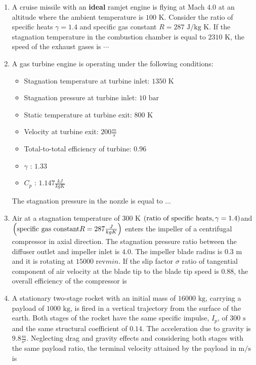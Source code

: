 \documentclass[journal,12pt,twocolumn]{IEEEtran}
\theoremstyle{remark}
\begin{document}
\begin{enumerate}[start=40]
    \item A cruise missile with an \textbf{ideal} ramjet engine is flying at Mach $4.0$ at an altitude where the ambient temperature is $100 \text{ K}$. Consider the ratio of specific heats $\gamma = 1.4$ and specific gas constant $R = 287 \text{ J/kg K}$. If the stagnation temperature in the combustion chamber is equal to $2310 \text{ K}$, the speed of the exhaust gases  is $\cdots$

    \item A gas turbine engine is operating under the following conditions:
    \begin{itemize}
        \item Stagnation temperature at turbine inlet: $1350 \text{ K}$
        \item Stagnation pressure at turbine inlet: $10 \text{ bar}$
        \item Static temperature at turbine exit: $800 \text{ K}$
        \item Velocity at turbine exit: $200  \frac{m}{s}$
        \item Total-to-total efficiency of turbine: $0.96$
        \item $\gamma$ : $1.33$
        \item $C_p$ : $1.147 \frac{ kJ}{kg K}$
    \end{itemize}
    
    The stagnation pressure  in the nozzle  is equal to $\dots$

    \item Air at a stagnation temperature of $300 \text{ K}$ $\left(\text{ratio of specific heats}, \gamma = 1.4 \right)$and $\left(\text{specific gas constant} R = 287 \frac {J}{kg K}\right)$ enters the impeller of a centrifugal compressor in axial direction. The stagnation pressure ratio between the diffuser outlet and impeller inlet is $4.0$. The impeller blade radius is $0.3 \text{ m}$ and it is rotating at $15000 \text{ rev}{min}$. If the slip factor $\sigma$ ratio of tangential component of air velocity   at the blade tip to the blade tip speed is $0.88$, the overall efficiency  of the compressor  is

    \item A stationary two-stage rocket with an initial mass of $16000 \text{ kg}$, carrying a payload of $1000 \text{ kg}$, is fired in a vertical trajectory from the surface of the earth. Both stages of the rocket have the same specific impulse, $I_p$, of $300 \text{ s}$ and the same structural coefficient of $0.14$. The acceleration due to gravity is $9.8\frac{ m}{s^2}$. Neglecting drag and gravity effects and considering both stages with the same payload ratio, the terminal velocity attained by the payload in $\text{m/s}$ is


\end{enumerate}
\end{document}

